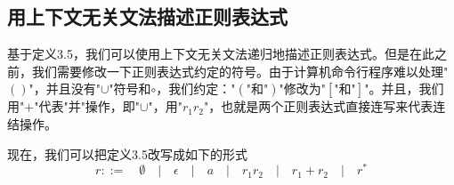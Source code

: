\documentclass[openany,oneside]{book}
\theoremstyle{definition}
\theoremstyle{definition}
\begin{document}
	
\subsection{用上下文无关文法描述正则表达式}
	基于定义3.5，我们可以使用上下文无关文法递归地描述正则表达式。但是在此之前，我们需要修改一下正则表达式约定的符号。由于计算机命令行程序难以处理"\(\left(\right)\)"，并且没有"\(\cup\)"符号和\(\circ\)，我们约定：\(\mbox{"}\left(\mbox{"和"}\right)\mbox{"}\)修改为\(\mbox{"}\left[  \mbox{"和"}\right]\mbox{"}\)。并且，我们用"\(+\)"代表"并"操作，即"\(\cup\)"，用"\(r_1 r_2\)"，也就是两个正则表达式直接连写来代表连结操作。
	
	现在，我们可以把定义3.5改写成如下的形式
	\begin{equation}
		r::= \quad \emptyset \quad| \quad\epsilon\quad |\quad a \quad  |\quad r_1 r_2\quad |\quad r_1 + r_2\quad | \quad r^*
	\end{equation}
	
\end{document}
